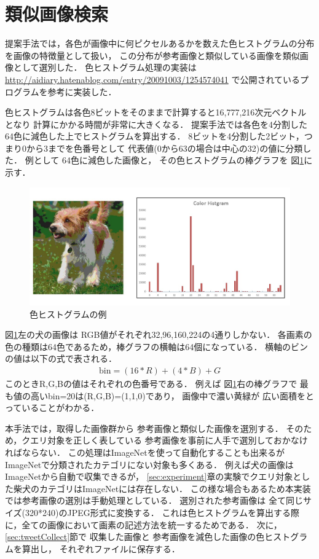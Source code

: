 \section{類似画像検索}
\label{sec:similar}
提案手法では，各色が画像中に何ピクセルあるかを数えた色ヒストグラムの分布を画像の特徴量として扱い，
この分布が参考画像と類似している画像を類似画像として選別した．
色ヒストグラム処理の実装は
\url{http://aidiary.hatenablog.com/entry/20091003/1254574041}
で公開されているプログラムを参考に実装した．

色ヒストグラムは各色8ビットをそのままで計算すると16,777,216次元ベクトルとなり
計算にかかる時間が非常に大きくなる．
提案手法では各色を4分割した64色に減色した上でヒストグラムを算出する．
8ビットを4分割した2ビット，つまり0から3までを色番号として
代表値(0から63の場合は中心の32)の値に分類した．
例として
64色に減色した画像と，
その色ヒストグラムの棒グラフを
図\ref{fig:color}に示す．
%
\begin{figure}[tb]
 \begin{center}
  \includegraphics[scale=0.50]{colorhist.jpg}
 \end{center}
 \caption{色ヒストグラムの例}
 \label{fig:color}
\end{figure}
%
%
図\ref{fig:color}左の犬の画像は
RGB値がそれぞれ32,96,160,224の4通りしかない．
各画素の色の種類は64色であるため，棒グラフの横軸は64個になっている．
横軸のビンの値は以下の式で表される．
\begin{eqnarray}
\mbox{bin} = (16 * R) + (4 * B) + G
\end{eqnarray}
このときR,G,Bの値はそれぞれの色番号である．
例えば
図\ref{fig:color}右の棒グラフで
最も値の高いbin=20は(R,G,B)=(1,1,0)であり，
画像中で濃い黄緑が
広い面積をとっていることがわかる．

本手法では，取得した画像群から
参考画像と類似した画像を選別する．
そのため，クエリ対象を正しく表している
参考画像を事前に人手で選別しておかなければならない．
この処理はImageNetを使って自動化することも出来るが
ImageNetで分類されたカテゴリにない対象も多くある．
例えば犬の画像はImageNetから自動で収集できるが，
\ref{sec:experiment}章の実験でクエリ対象とした柴犬のカテゴリはImageNetには存在しない．
この様な場合もあるため本実装では参考画像の選別は手動処理としている．
%
選別された参考画像は
全て同じサイズ(320*240)のJPEG形式に変換する．
これは色ヒストグラムを算出する際に，全ての画像において画素の記述方法を統一するためである．
次に，\ref{sec:tweetCollect}節で
収集した画像と
参考画像を減色した画像の色ヒストグラムを算出し，
それぞれファイルに保存する．

